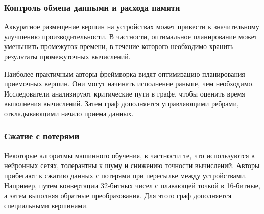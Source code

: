 \subsubsection{Контроль обмена данными и расхода памяти}

Аккуратное размещение вершин на устройствах может привести к значительному
улучшению производительности. В частности, оптимальное планирование может
уменьшить промежуток времени, в течение которого необходимо хранить результаты
промежуточных вычислений.

Наиболее практичным авторы фреймворка видят оптимизацию планирования приемочных
вершин. Они могут начинать исполнение раньше, чем необходимо. Исследователи
анализируют критические пути в графе, чтобы оценить время выполнения вычислений.
Затем граф дополняется управляющими ребрами, откладывающими начало приема данных.

\subsubsection{Сжатие с потерями}

Некоторые алгоритмы машинного обучения, в частности те, что используются в
нейронных сетях, толерантны к шуму и снижению точности вычислений. Авторы
прибегают к сжатию данных с потерями при пересылке между устройствами. Например,
путем конвертации 32-битных чисел с плавающей точкой в 16-битные, а затем
выполняя обратные преобразования. Для этого граф дополняется специальными
вершинами.
